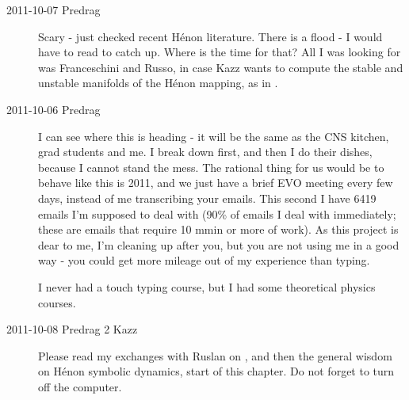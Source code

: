 \begin{description}
  	
\item[2011-10-07 Predrag] Scary - just checked recent H\'enon literature.
There is a flood - I would have to read
to catch up. Where is the time for that? All I was looking for was
Franceschini and Russo, in case Kazz wants to compute
the stable and unstable manifolds of the {H\'enon} mapping, as in
.


\item[2011-10-06 Predrag]
I can see where this is heading - it will be the same as the CNS kitchen,
grad students and me. I break down first, and then I do their dishes,
because I cannot stand the mess. The rational thing for us would be to
behave like this is 2011, and we just have a brief EVO meeting every few
days, instead of me transcribing your emails. This second I have 6419
emails I'm supposed to deal with (90\% of emails I deal with immediately;
these are emails that require 10 mmin or more of work). As this project
is dear to me, I'm cleaning up after you, but you are not using me in a
good way - you could get more mileage out of my experience than typing.

I never had a touch typing course, but I had some theoretical physics
courses.

\item[2011-10-08 Predrag 2 Kazz] Please read my exchanges with Ruslan on
, and then the general wisdom on
H\'enon symbolic dynamics, start of this chapter. Do not forget to
turn off the computer.


\end{description}
